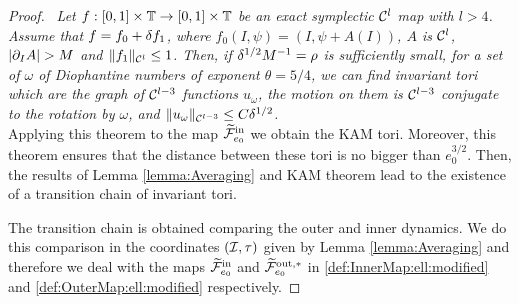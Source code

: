 \begin{proof}
 \
  {\it Let $f:[0,1]\times\mathbb{T}\rightarrow [0,1]\times\mathbb{T}$ be an exact symplectic $\mathcal{C}^l$ map with $l>4$.
    Assume that $f=f_0+\delta f_1$, where $f_0(I,\psi)=(I,\psi+A(I))$, $A$ is $\mathcal{C}^l$, $|\pa_I A|>M$
    and $\|f_1\|_{\mathcal{C}^l}\leq 1$.
    Then, if $\delta^{1/2} M^{-1}=\rho$ is sufficiently small, for a set of $\omega$ of Diophantine numbers
    of exponent $\theta=5/4$, we can find invariant tori which are the graph of $\mathcal{C}^{l-3}$ functions
    $u_\omega$, the motion on them is $\mathcal{C}^{l-3}$ conjugate to the rotation by $\omega$, and
    $\|u_\omega\|_{\mathcal{C}^{l-3}}\leq C\delta^{1/2}$. }\\



  Applying this theorem to the map $\widetilde{\mathcal{F}}^{\mathrm{in}}_{e_0}$ we obtain the KAM tori.
  Moreover, this theorem ensures that the distance between these tori is no bigger than $e_0^{3/2}$.
  Then, the results of Lemma \ref{lemma:Averaging} and KAM theorem lead to the existence
  of a transition chain of invariant tori.


  The transition chain is obtained comparing the outer and inner dynamics. We do this comparison
  in the coordinates $(\mathcal{I},\tau)$ given by Lemma \ref{lemma:Averaging} and therefore we deal with
  the maps $\widetilde{\mathcal{F}}_{e_0}^{\mathrm{in}}$ and $\widetilde{\mathcal{F}}_{e_0}^{\mathrm{out},\ast}$ in \eqref{def:InnerMap:ell:modified} and
  \eqref{def:OuterMap:ell:modified} respectively.


\end{proof}
